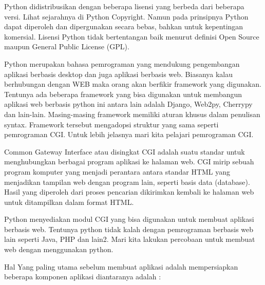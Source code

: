\documentclass{wileySix}
\begin{document}
\par
\vspace{12pt}
Python didistribusikan dengan beberapa lisensi yang berbeda dari beberapa versi. Lihat sejarahnya di Python Copyright. Namun pada prinsipnya Python dapat diperoleh dan dipergunakan secara bebas, bahkan untuk kepentingan komersial. Lisensi Python tidak bertentangan baik menurut definisi Open Source maupun General Public License (GPL). \par
\vspace{12pt}
Python merupakan bahasa pemrograman yang mendukung pengembangan aplikasi berbasis desktop dan juga aplikasi berbasis web. Biasanya kalau berhubungan dengan WEB maka orang akan berfikir framework yang digunakan. Tentunya ada beberapa framework yang bisa digunakan untuk membangun aplikasi web berbasis python ini antara lain adalah Django, Web2py, Cherrypy dan lain-lain. Masing-masing framework memiliki aturan khusus dalam penulisan syntax. Framework tersebut mengadopsi struktur yang sama seperti pemrograman CGI. Untuk lebih jelasnya mari kita pelajari pemrograman CGI. \par
\vspace{12pt}
Common Gateway Interface atau disingkat CGI adalah suatu standar untuk menghubungkan berbagai program aplikasi ke halaman web. CGI mirip sebuah program komputer yang menjadi perantara antara standar HTML yang menjadikan tampilan web dengan program lain, seperti basis data (database). Hasil yang diperoleh dari proses pencarian dikirimkan kembali ke halaman web untuk ditampilkan dalam format HTML. \par
\vspace{12pt}
Python menyediakan modul CGI yang bisa digunakan untuk membuat aplikasi berbasis web. Tentunya python tidak kalah dengan pemrograman berbasis web lain seperti Java, PHP dan lain2. Mari kita lakukan percobaan untuk membuat web dengan menggunakan python. \par
\noindent 
Hal Yang paling utama sebelum membuat aplikasi adalah mempersiapkan beberapa komponen aplikasi diantaranya adalah : \par
\noindent 
\end{document}
